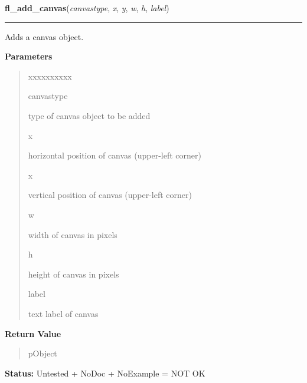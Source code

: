     \label{xformslib:library:fl_add_canvas}

    \vspace{0.5ex}

\hspace{.8\funcindent}\begin{boxedminipage}{\funcwidth}

    \raggedright \textbf{fl\_add\_canvas}(\textit{canvastype}, \textit{x}, \textit{y}, \textit{w}, \textit{h}, \textit{label})

    \vspace{-1.5ex}

    \rule{\textwidth}{0.5\fboxrule}
\setlength{\parskip}{2ex}
    Adds a canvas object.

\setlength{\parskip}{1ex}
      \textbf{Parameters}
      \vspace{-1ex}

      \begin{quote}
        \begin{Ventry}{xxxxxxxxxx}

          \item[canvastype]

          type of canvas object to be added

          \item[x]

          horizontal position of canvas (upper-left corner)

          \item[x]

          vertical position of canvas (upper-left corner)

          \item[w]

          width of canvas in pixels

          \item[h]

          height of canvas in pixels

          \item[label]

          text label of canvas

        \end{Ventry}

      \end{quote}

      \textbf{Return Value}
    \vspace{-1ex}

      \begin{quote}
      pObject

      \end{quote}

\textbf{Status:} Untested + NoDoc + NoExample = NOT OK



    \end{boxedminipage}


